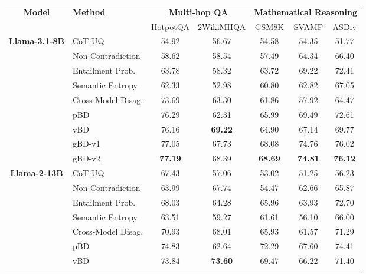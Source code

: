 \documentclass[letterpaper]{article} %
\begin{document}
\begin{table}[t]
  \centering
  \footnotesize
  \setlength{\tabcolsep}{6pt}
  \begin{tabular}{c l cc ccc}
    \toprule
    \multirow{2}{*}{\textbf{Model}} & \multirow{2}{*}{\textbf{Method}}
      & \multicolumn{2}{c}{\textbf{Multi-hop QA}}
      & \multicolumn{3}{c}{\textbf{Mathematical Reasoning}} \\
    \cmidrule(lr){3-4}\cmidrule(lr){5-7}
      & & HotpotQA & 2WikiMHQA & GSM8K & SVAMP & ASDiv \\
    \midrule
    \multirow{9}{*}{\textbf{Llama-3.1-8B}}
      & CoT-UQ                  & 54.92 & 56.67 & 54.58 & 54.35 & 51.77 \\
      & Non-Contradiction       & 58.62 & 58.54 & 57.49 & 64.34 & 66.40 \\
      & Entailment Prob.        & 63.78 & 58.32 & 63.72 & 69.22 & 72.41 \\
      & Semantic Entropy        & 62.33 & 52.98 & 60.80 & 62.82 & 67.05 \\
      & Cross-Model Disag.      & 73.69 & 63.30 & 61.86 & 57.92 & 64.47 \\
    \cmidrule(lr){2-7}
      & pBD                     & 76.29 & 62.31 & 65.99 & 69.49 & 72.61 \\
      & vBD                     & 76.16 & \textbf{69.22} & 64.90 & 67.14 & 69.77 \\
      & gBD-v1                  & 77.05 & 67.73 & 68.08 & 74.76 & 76.02 \\
      & gBD-v2                  & \textbf{77.19} & 68.39 & \textbf{68.69} & \textbf{74.81} & \textbf{76.12} \\
    \midrule
    \multirow{9}{*}{\textbf{Llama-2-13B}}
      & CoT-UQ                  & 67.43 & 57.06 & 53.02 & 51.25 & 56.23 \\
      & Non-Contradiction       & 63.99 & 67.74 & 54.47 & 62.66 & 65.87 \\
      & Entailment Prob.        & 68.03 & 64.28 & 65.96 & 63.93 & 72.70 \\
      & Semantic Entropy        & 63.51 & 59.27 & 61.61 & 56.10 & 66.00 \\
      & Cross-Model Disag.      & 70.93 & 68.01 & 65.93 & 61.57 & 71.29 \\
    \cmidrule(lr){2-7}
      & pBD                     & 74.83 & 62.64 & 72.29 & 67.60 & 74.41 \\
      & vBD                     & 73.84 & \textbf{73.60} & 69.47 & 66.22 & 71.40 \\

\end{tabular}
\end{table}
\end{document}
